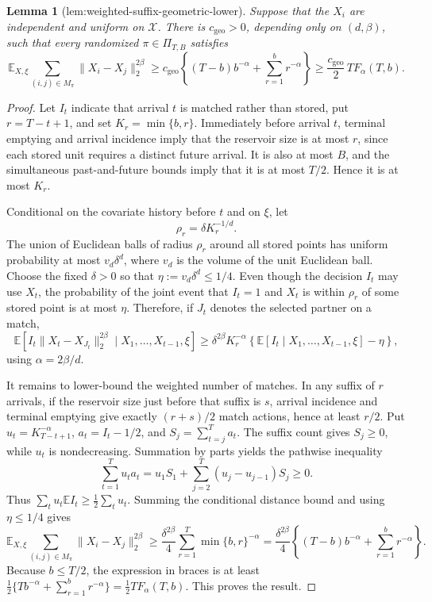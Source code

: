 \documentclass{article}
\newtheorem{lemma}{Lemma}
\begin{document}
\begin{lemma}[lem:weighted-suffix-geometric-lower]\label{lem:weighted-suffix-geometric-lower}
Suppose that the \(X_i\) are independent and uniform on \(\mathcal X\).  There is \(c_{\mathrm{geo}}>0\), depending only on \((d,\beta)\), such that every randomized \(\pi\in\Pi_{T,B}\) satisfies
\[
\mathbb E_{X,\xi}\sum_{(i,j)\in M_\pi}\|X_i-X_j\|_2^{2\beta}
\ge c_{\mathrm{geo}}\left\{(T-b)b^{-\alpha}+\sum_{r=1}^b r^{-\alpha}\right\}
\ge \frac{c_{\mathrm{geo}}}{2}\,T F_\alpha(T,b).
\]
\end{lemma}
\begin{proof}
Let \(I_t\) indicate that arrival \(t\) is matched rather than stored, put \(r=T-t+1\), and set \(K_r=\min\{b,r\}\).  Immediately before arrival \(t\), terminal emptying and arrival incidence imply that the reservoir size is at most \(r\), since each stored unit requires a distinct future arrival.  It is also at most \(B\), and the simultaneous past-and-future bounds imply that it is at most \(T/2\).  Hence it is at most \(K_r\).

Conditional on the covariate history before \(t\) and on \(\xi\), let
\[
\rho_r=\delta K_r^{-1/d}.
\]
The union of Euclidean balls of radius \(\rho_r\) around all stored points has uniform probability at most \(v_d\delta^d\), where \(v_d\) is the volume of the unit Euclidean ball.  Choose the fixed \(\delta>0\) so that \(\eta:=v_d\delta^d\le1/4\).  Even though the decision \(I_t\) may use \(X_t\), the probability of the joint event that \(I_t=1\) and \(X_t\) is within \(\rho_r\) of some stored point is at most \(\eta\).  Therefore, if \(J_t\) denotes the selected partner on a match,
\[
\mathbb E[I_t\|X_t-X_{J_t}\|_2^{2\beta}\mid X_1,\ldots,X_{t-1},\xi]
\ge\delta^{2\beta}K_r^{-\alpha}\left\{\mathbb E[I_t\mid X_1,\ldots,X_{t-1},\xi]-\eta\right\},
\]
using \(\alpha=2\beta/d\).

It remains to lower-bound the weighted number of matches.  In any suffix of \(r\) arrivals, if the reservoir size just before that suffix is \(s\), arrival incidence and terminal emptying give exactly \((r+s)/2\) match actions, hence at least \(r/2\).  Put \(u_t=K_{T-t+1}^{-\alpha}\), \(a_t=I_t-1/2\), and \(S_j=\sum_{t=j}^T a_t\).  The suffix count gives \(S_j\ge0\), while \(u_t\) is nondecreasing.  Summation by parts yields the pathwise inequality
\[
\sum_{t=1}^T u_ta_t=u_1S_1+\sum_{j=2}^T(u_j-u_{j-1})S_j\ge0.
\]
Thus \(\sum_tu_t\mathbb E I_t\ge\frac12\sum_tu_t\).  Summing the conditional distance bound and using \(\eta\le1/4\) gives
\[
\mathbb E_{X,\xi}\sum_{(i,j)\in M_\pi}\|X_i-X_j\|_2^{2\beta}
\ge\frac{\delta^{2\beta}}4\sum_{r=1}^T\min\{b,r\}^{-\alpha}
=\frac{\delta^{2\beta}}4\left\{(T-b)b^{-\alpha}+\sum_{r=1}^b r^{-\alpha}\right\}.
\]
Because \(b\le T/2\), the expression in braces is at least \(\frac12\{Tb^{-\alpha}+\sum_{r=1}^b r^{-\alpha}\}=\frac12TF_\alpha(T,b)\).  This proves the result.
\end{proof}
\end{document}
